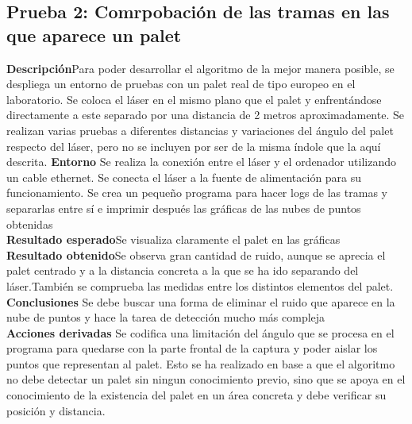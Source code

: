 \subsection{Prueba 2: Comrpobación de las tramas en las que aparece un palet}
\textbf{Descripción}Para poder desarrollar el algoritmo de la mejor manera posible, se despliega un entorno de pruebas con un palet real de tipo europeo en el laboratorio. Se coloca el láser en el mismo plano que el palet y enfrentándose directamente a este separado por una distancia de 2 metros aproximadamente. Se realizan varias pruebas a diferentes distancias y variaciones del ángulo del palet respecto del láser, pero no se incluyen por ser de la misma  índole que la aquí descrita.
\textbf{Entorno} Se realiza la conexión entre el láser y el ordenador utilizando un cable ethernet. Se conecta el láser a la fuente de alimentación para su funcionamiento. Se crea un pequeño programa para hacer logs de las tramas y separarlas entre sí e imprimir después las gráficas de las nubes de puntos obtenidas\\
\textbf{Resultado esperado}Se visualiza claramente el palet en las gráficas\\
\textbf{Resultado obtenido}Se observa gran cantidad de ruido, aunque se aprecia el palet centrado y a la distancia concreta a la que se ha ido separando del láser.También se comprueba las medidas entre los distintos elementos del palet.\\
\textbf{Conclusiones} Se debe buscar una forma de eliminar el ruido que aparece en la nube de puntos y hace la tarea de detección mucho más compleja\\
\textbf{Acciones derivadas}  Se codifica una limitación del ángulo que se procesa en el programa para quedarse con la parte frontal de la captura y poder aislar los puntos que representan al palet. Esto se ha realizado en base a que el algoritmo no debe detectar un palet sin ningun conocimiento previo, sino que se apoya en el conocimiento de la existencia del palet en un área concreta y debe verificar su posición y distancia.